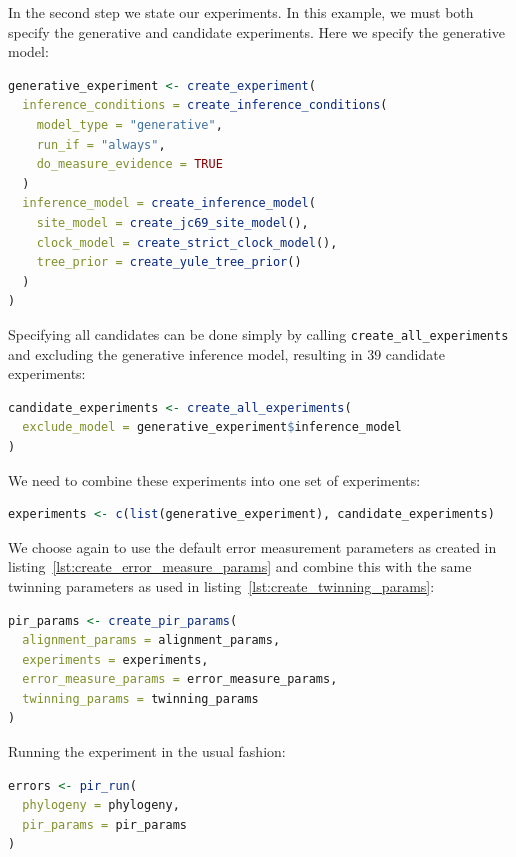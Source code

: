 \documentclass{article}
\begin{document}
In the second step we state our experiments. 
In this example, we must both specify the generative and candidate experiments. 
Here we specify the generative model:

\begin{lstlisting}[language=R, floatplacement=H, frame=single]
generative_experiment <- create_experiment(
  inference_conditions = create_inference_conditions(
    model_type = "generative",
    run_if = "always",
    do_measure_evidence = TRUE
  )
  inference_model = create_inference_model(
    site_model = create_jc69_site_model(),
    clock_model = create_strict_clock_model(),
    tree_prior = create_yule_tree_prior()
  )
)
\end{lstlisting}

Specifying all candidates can be done simply by calling 
\verb;create_all_experiments; and excluding the generative inference model,
resulting in 39 candidate experiments:

\begin{lstlisting}[language=R, floatplacement=H, frame=single]
candidate_experiments <- create_all_experiments(
  exclude_model = generative_experiment$inference_model
)
\end{lstlisting}

We need to combine these experiments into one set of experiments:

\begin{lstlisting}[language=R, floatplacement=H, frame=single]
experiments <- c(list(generative_experiment), candidate_experiments)
\end{lstlisting}

We choose again to use the default error measurement parameters
as created in listing~\ref{lst:create_error_measure_params}
and combine this with the same twinning parameters 
as used in listing~\ref{lst:create_twinning_params}:

\begin{lstlisting}[language=R, floatplacement=H, frame=single]
pir_params <- create_pir_params(
  alignment_params = alignment_params,
  experiments = experiments,
  error_measure_params = error_measure_params,
  twinning_params = twinning_params
)
\end{lstlisting}

Running the experiment in the usual fashion:

\begin{lstlisting}[language=R, floatplacement=H, frame=single]
errors <- pir_run(
  phylogeny = phylogeny,
  pir_params = pir_params
)
\end{lstlisting}
\end{document}

